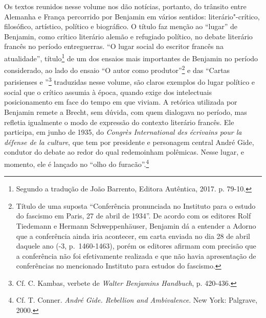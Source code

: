 Os textos reunidos nesse volume nos dão notícias, portanto, do trânsito
entre Alemanha e França percorrido por Benjamin em vários sentidos:
literário"-crítico, filosófico, artístico, político e biográfico. O
título faz menção ao ``lugar'' de Benjamin, como crítico literário
alemão e refugiado político, no debate literário francês no período
entreguerras. ``O lugar social do escritor francês na atualidade'',
título\footnote{Segundo a tradução de João Barrento, Editora Autêntica,
  2017. p. 79-10.} de um dos ensaios mais importantes de Benjamin no
período considerado, ao lado do ensaio ``O autor como
produtor''\footnote{Título de uma suposta ``Conferência pronunciada no
  Instituto para o estudo do fascismo em Paris, 27 de abril de 1934''.
  De acordo com os editores Rolf Tiedemann e Hermann Schweppenhäuser,
  Benjamin dá a entender a Adorno que a conferência ainda iria
  acontecer, em carta enviada no dia 28 de abril daquele ano (-3, p.~1460-1463), porém os editores afirmam com
  precisão que a conferência não foi efetivamente realizada e que não
  havia apresentação de conferências no mencionado Instituto para
  estudos do fascismo.} e das ``Cartas parisienses  e ''\footnote{Cf.
  C. Kambas, verbete de \emph{Walter Benjamins Handbuch}, p. 420-436.}
traduzidas nesse volume, são claros exemplos do lugar político e social
que o crítico assumia à época, quando exige dos intelectuais
posicionamento em face do tempo em que viviam. A retórica utilizada por
Benjamin remete a Brecht, sem dúvida, com quem dialogava no período, mas
refletia igualmente o modo de expressão do contexto literário francês.
Ele participa, em junho de 1935, do \emph{Congrès International des
écrivains pour la défense de la culture}, que tem por presidente e
personagem central André Gide, condutor do debate ao redor do qual
redemoinham polêmicas. Nesse lugar, e momento, ele é lançado no ``olho do
furacão''.\footnote{Cf. T. Conner. \emph{André Gide. Rebellion and
  Ambivalence}. New York: Palgrave, 2000.}

